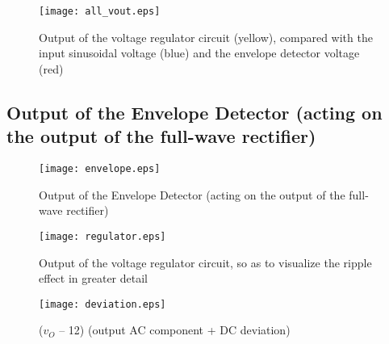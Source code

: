 \par
\begin{figure}[H] \centering
\texttt{[image: all\_vout.eps]}
\caption{Output of the voltage regulator circuit (yellow), compared with the input sinusoidal voltage (blue) and the envelope detector voltage (red)}
\label{fig:all_vout}
\end{figure}


\subsection{Output of the Envelope Detector (acting on the output of the full-wave rectifier)}

\par
\begin{figure}[H] \centering
\texttt{[image: envelope.eps]}
\caption{Output of the Envelope Detector (acting on the output of the full-wave rectifier)}
\label{fig:envelope}
\end{figure}



\par
\begin{figure}[H] \centering
\texttt{[image: regulator.eps]}
\caption{Output of the voltage regulator circuit, so as to visualize the ripple effect in greater detail}
\label{fig:regulator}
\end{figure}

\par
\begin{figure}[H] \centering
\texttt{[image: deviation.eps]}
\caption{($v_O$ – 12) (output AC component + DC deviation)}
\label{fig:deviation}
\end{figure}









\pagebreak


